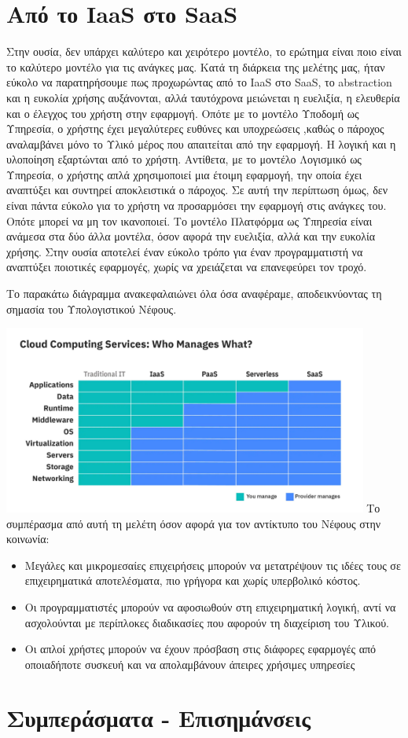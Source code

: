 \documentclass{article}
\begin{document}
\section{Από το IaaS στο SaaS}
Στην ουσία, δεν υπάρχει καλύτερο και χειρότερο μοντέλο, το ερώτημα είναι ποιο είναι το καλύτερο μοντέλο για τις ανάγκες μας. Κατά τη διάρκεια της μελέτης μας, ήταν εύκολο να παρατηρήσουμε πως προχωρώντας από το IaaS στο SaaS, το abstraction και η ευκολία χρήσης αυξάνονται, αλλά ταυτόχρονα μειώνεται η ευελιξία, η ελευθερία και ο έλεγχος του χρήστη στην εφαρμογή. Οπότε με το μοντέλο Υποδομή ως Υπηρεσία, ο χρήστης έχει μεγαλύτερες ευθύνες και υποχρεώσεις ,καθώς ο πάροχος αναλαμβάνει μόνο το Υλικό μέρος που απαιτείται από την εφαρμογή. Η λογική και η υλοποίηση εξαρτώνται από το χρήστη. Αντίθετα, με το μοντέλο Λογισμικό ως Υπηρεσία, ο χρήστης απλά χρησιμοποιεί μια έτοιμη εφαρμογή, την οποία έχει αναπτύξει και συντηρεί αποκλειστικά ο πάροχος. Σε αυτή την περίπτωση όμως, δεν είναι πάντα εύκολο για το χρήστη να προσαρμόσει την εφαρμογή στις ανάγκες του. Οπότε μπορεί να μη τον ικανοποιεί. Το μοντέλο Πλατφόρμα ως Υπηρεσία είναι ανάμεσα στα δύο άλλα μοντέλα, όσον αφορά την ευελιξία, αλλά και την ευκολία χρήσης. Στην ουσία αποτελεί έναν εύκολο τρόπο για έναν προγραμματιστή να αναπτύξει ποιοτικές εφαρμογές, χωρίς να χρειάζεται να επανεφεύρει τον τροχό.

Το παρακάτω διάγραμμα ανακεφαλαιώνει όλα όσα αναφέραμε, αποδεικνύοντας τη σημασία του Υπολογιστικού Νέφους. 


\includegraphics[width=120mm]{ibm.jpg}
Το συμπέρασμα από αυτή τη μελέτη όσον αφορά για τον αντίκτυπο του Νέφους στην κοινωνία:
\begin{itemize}
\item Μεγάλες και μικρομεσαίες επιχειρήσεις μπορούν να μετατρέψουν τις ιδέες τους σε επιχειρηματικά αποτελέσματα, πιο γρήγορα και χωρίς υπερβολικό κόστος.
\item Οι προγραμματιστές μπορούν να αφοσιωθούν στη επιχειρηματική λογική, αντί να ασχολούνται με περίπλοκες διαδικασίες που αφορούν τη διαχείριση του Υλικού.
\item	Οι απλοί χρήστες μπορούν να έχουν πρόσβαση στις διάφορες εφαρμογές από οποιαδήποτε συσκευή και να απολαμβάνουν άπειρες χρήσιμες υπηρεσίες
\end{itemize}

\section{Συμπεράσματα - Επισημάνσεις}
\end{document}
